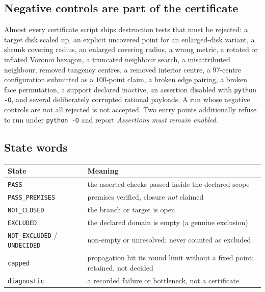 \subsection{Negative controls are part of the certificate}

Almost every certificate script ships destruction tests that must be rejected: a target disk scaled
up, an explicit uncovered point for an enlarged-disk variant, a shrunk covering radius, an enlarged
covering radius, a wrong metric, a rotated or inflated Voronoi hexagon, a truncated neighbour
search, a misattributed neighbour, removed tangency centres, a removed interior centre, a
$97$-centre configuration submitted as a $100$-point claim, a broken edge pairing, a broken face
permutation, a support declared inactive, an assertion disabled with \texttt{python -\allowbreak{}O}, and
several deliberately corrupted rational payloads. A run whose negative controls are not all
rejected is not accepted. Two entry points additionally refuse to run under \texttt{python -\allowbreak{}O} and
report \emph{Assertions must remain enabled}.

\subsection{State words}

\begin{center}
\footnotesize
\begin{tabular}{@{}>{\raggedright\arraybackslash}p{}>{\raggedright\arraybackslash}p{}@{}}
\toprule
State & Meaning \\
\midrule
\texttt{PASS} & the asserted checks passed inside the declared scope \\
\texttt{PASS\_\allowbreak{}PREMISES} & premises verified, closure \emph{not} claimed \\
\texttt{NOT\_\allowbreak{}CLOSED} & the branch or target is open \\
\texttt{EXCLUDED} & the declared domain is empty (a genuine exclusion) \\
\texttt{NOT\_\allowbreak{}EXCLUDED} / \texttt{UNDECIDED} & non-empty or unresolved; never counted as excluded \\
\texttt{capped} & propagation hit its round limit without a fixed point; retained, not decided \\
\texttt{diagnostic} & a recorded failure or bottleneck, not a certificate \\
\bottomrule
\end{tabular}
\end{center}


